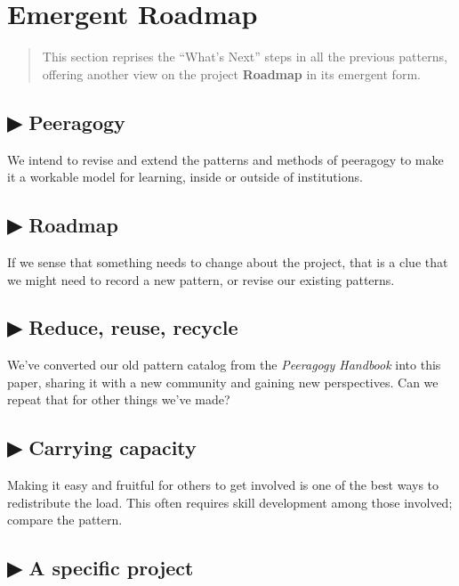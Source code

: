 \hypertarget{emergent-roadmap}{%
\section{Emergent Roadmap}\label{emergent-roadmap}}

\begin{quote}
This section reprises the ``What's Next'' steps in all the previous
patterns, offering another view on the project \textbf{Roadmap} in its
emergent form.
\end{quote}

\hypertarget{peeragogy}{%
\subsection{▶ Peeragogy}\label{peeragogy}}

We intend to revise and extend the patterns and methods of peeragogy to
make it a workable model for learning, inside or outside of
institutions.

\hypertarget{roadmap}{%
\subsection{▶ Roadmap}\label{roadmap}}

If we sense that something needs to change about the project, that is a
clue that we might need to record a new pattern, or revise our existing
patterns.

\hypertarget{reduce-reuse-recycle}{%
\subsection{▶ Reduce, reuse, recycle}\label{reduce-reuse-recycle}}

We've converted our old pattern catalog from the \emph{Peeragogy
Handbook} into this paper, sharing it with a new community and gaining
new perspectives. Can we repeat that for other things we've made?

\hypertarget{carrying-capacity}{%
\subsection{▶ Carrying capacity}\label{carrying-capacity}}

Making it easy and fruitful for others to get involved is one of the
best ways to redistribute the load. This often requires skill
development among those involved; compare the pattern.

\hypertarget{a-specific-project}{%
\subsection{▶ A specific project}\label{a-specific-project}}

